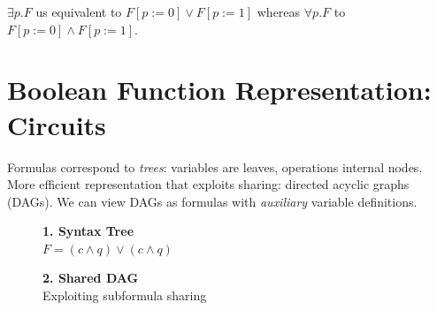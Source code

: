 \documentclass[11pt]{article}
\begin{document}
$\exists p. F$ us equivalent to $F[p := 0] \lor F[p := 1]$ whereas $\forall p. F$ to $F[p := 0] \land F[p := 1]$.

\newpage
\section*{Boolean Function Representation: Circuits}

Formulas correspond to \textit{trees}: variables are leaves, operations internal nodes. \\
More efficient representation that exploits sharing: directed acyclic graphs (DAGs). We can view DAGs as formulas with \textit{auxiliary} variable definitions. 

\begin{figure}[htbp]
    \centering
    
    \begin{minipage}{0.31\textwidth}
        \centering
        \textbf{1. Syntax Tree} \\[0.5em]
        \small $F = (c \land q) \lor (c \land q)$ \\[1em]
    \end{minipage}
    \hfill
    \begin{minipage}{0.31\textwidth}
        \centering
        \textbf{2. Shared DAG} \\[0.5em]
        \small Exploiting subformula sharing \\[1em]
\end{minipage}
\end{figure}
\end{document}
